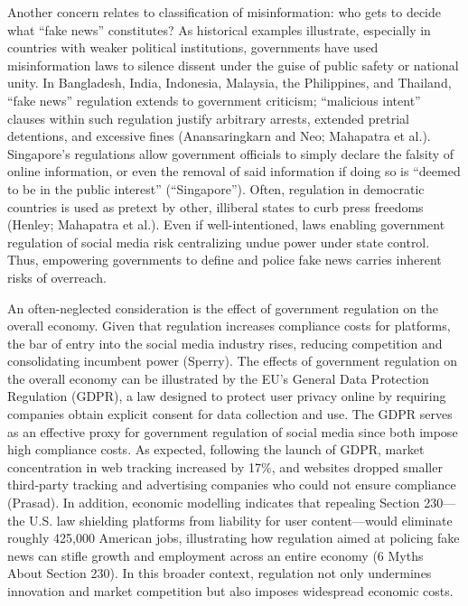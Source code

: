 Another concern relates to classification of misinformation: who gets to decide what “fake news” constitutes? As historical examples illustrate, especially in countries with weaker political institutions, governments have used misinformation laws to silence dissent under the guise of public safety or national unity. In Bangladesh, India, Indonesia, Malaysia, the Philippines, and Thailand, “fake news” regulation extends to government criticism; “malicious intent” clauses within such regulation justify arbitrary arrests, extended pretrial detentions, and excessive fines (Anansaringkarn and Neo; Mahapatra et al.). Singapore’s regulations allow government officials to simply declare the falsity of online information, or even the removal of said information if doing so is “deemed to be in the public interest” (“Singapore”). Often, regulation in democratic countries is used as pretext by other, illiberal states to curb press freedoms (Henley; Mahapatra et al.). Even if well-intentioned, laws enabling government regulation of social media risk centralizing undue power under state control. Thus, empowering governments to define and police fake news carries inherent risks of overreach. 

An often-neglected consideration is the effect of government regulation on the overall economy. Given that regulation increases compliance costs for platforms, the bar of entry into the social media industry rises, reducing competition and consolidating incumbent power (Sperry). The effects of government regulation on the overall economy can be illustrated by the EU’s General Data Protection Regulation (GDPR), a law designed to protect user privacy online by requiring companies obtain explicit consent for data collection and use. The GDPR serves as an effective proxy for government regulation of social media since both impose high compliance costs. As expected, following the launch of GDPR, market concentration in web tracking increased by 17\%, and websites dropped smaller third-party tracking and advertising companies who could not ensure compliance (Prasad). In addition, economic modelling indicates that repealing Section 230—the U.S. law shielding platforms from liability for user content—would eliminate roughly 425,000 American jobs, illustrating how regulation aimed at policing fake news can stifle growth and employment across an entire economy (6 Myths About Section 230). In this broader context, regulation not only undermines innovation and market competition but also imposes widespread economic costs. 

